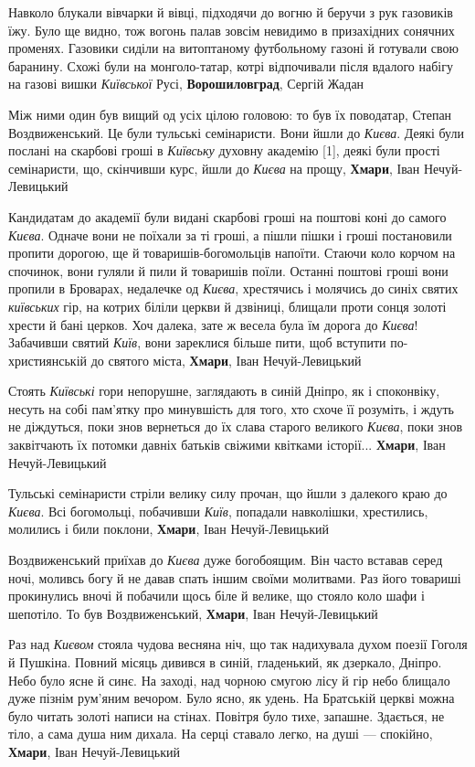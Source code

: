 Навколо блукали вівчарки й вівці, підходячи до вогню й беручи з рук газовиків
їжу. Було ще видно, тож вогонь палав зовсім невидимо в призахідних сонячних
променях. Газовики сиділи на витоптаному футбольному газоні й готували свою
баранину. Схожі були на монголо-татар, котрі відпочивали після вдалого набігу
на газові вишки \emph{Київської} Русі, \textbf{Ворошиловград}, Сергій Жадан

Між ними один був вищий од усіх цілою головою: то був їх поводатар, Степан
Воздвиженський. Це були тульські семінаристи. Вони йшли до \emph{Києва}. Деякі
були послані на скарбові гроші в \emph{Київську} духовну академію [1], деякі
були прості семінаристи, що, скінчивши курс, йшли до \emph{Києва} на прощу,
\textbf{Хмари}, Іван Нечуй-Левицький

Кандидатам до академії були видані скарбові гроші на поштові коні до самого
\emph{Києва}. Одначе вони не поїхали за ті гроші, а пішли пішки і гроші
постановили пропити дорогою, ще й товаришів-богомольців напоїти. Стаючи коло
корчом на спочинок, вони гуляли й пили й товаришів поїли. Останні поштові гроші
вони пропили в Броварах, недалечке од \emph{Києва}, хрестячись і молячись до
синіх святих \emph{київських} гір, на котрих біліли церкви й дзвіниці, блищали
проти сонця золоті хрести й бані церков. Хоч далека, зате ж весела була їм
дорога до \emph{Києва}!  Забачивши святий \emph{Київ}, вони зареклися більше
пити, щоб вступити по-християнській до святого міста, \textbf{Хмари}, Іван
Нечуй-Левицький

Стоять \emph{Київські} гори непорушне, заглядають в синій Дніпро, як і
споконвіку, несуть на собі пам'ятку про минувшість для того, хто схоче її
розуміть, і ждуть не діждуться, поки знов вернеться до їх слава старого
великого \emph{Києва}, поки знов заквітчають їх потомки давніх батьків свіжими
квітками історії... \textbf{Хмари}, Іван Нечуй-Левицький 

Тульські семінаристи стріли велику силу прочан, що йшли з далекого краю до
\emph{Києва}. Всі богомольці, побачивши \emph{Київ}, попадали навколішки,
хрестились, молились і били поклони, \textbf{Хмари}, Іван Нечуй-Левицький

Воздвиженський приїхав до \emph{Києва} дуже богобоящим. Він часто вставав серед ночі,
моливсь богу й не давав спать іншим своїми молитвами. Раз його товариші
прокинулись вночі й побачили щось біле й велике, що стояло коло шафи і
шепотіло. То був Воздвиженський, \textbf{Хмари}, Іван Нечуй-Левицький

Раз над \emph{Києвом} стояла чудова весняна ніч, що так надихувала духом поезії
Гоголя й Пушкіна. Повний місяць дивився в синій, гладенький, як дзеркало,
Дніпро. Небо було ясне й синє. На заході, над чорною смугою лісу й гір небо
блищало дуже пізнім рум'яним вечором. Було ясно, як удень. На Братській церкві
можна було читать золоті написи на стінах. Повітря було тихе, запашне.
Здається, не тіло, а сама душа ним дихала. На серці ставало легко, на душі —
спокійно, \textbf{Хмари}, Іван Нечуй-Левицький

